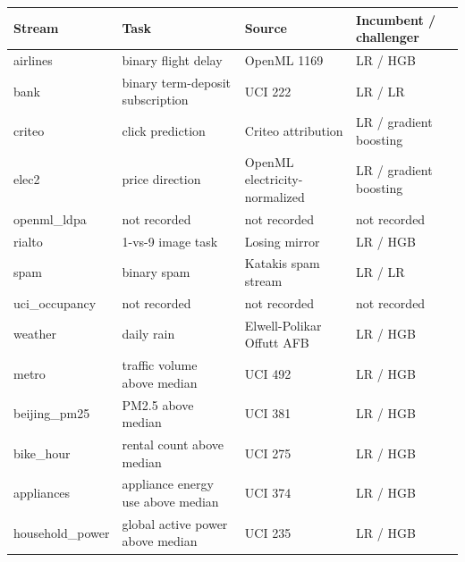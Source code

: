 \begin{tabular}{@{}p{2.5cm}p{4.1cm}p{3.6cm}p{3.4cm}@{}}
\toprule
Stream & Task & Source & Incumbent / challenger \\
\midrule
airlines & binary flight delay & OpenML 1169 & LR / HGB \\
bank & binary term-deposit subscription & UCI 222 & LR / LR \\
criteo & click prediction & Criteo attribution & LR / gradient boosting \\
elec2 & price direction & OpenML electricity-normalized & LR / gradient boosting \\
openml\_ldpa & not recorded & not recorded & not recorded \\
rialto & 1-vs-9 image task & Losing mirror & LR / HGB \\
spam & binary spam & Katakis spam stream & LR / LR \\
uci\_occupancy & not recorded & not recorded & not recorded \\
weather & daily rain & Elwell-Polikar Offutt AFB & LR / HGB \\
\midrule
metro & traffic volume above median & UCI 492 & LR / HGB \\
beijing\_pm25 & PM2.5 above median & UCI 381 & LR / HGB \\
bike\_hour & rental count above median & UCI 275 & LR / HGB \\
appliances & appliance energy use above median & UCI 374 & LR / HGB \\
household\_power & global active power above median & UCI 235 & LR / HGB \\
\bottomrule
\end{tabular}
